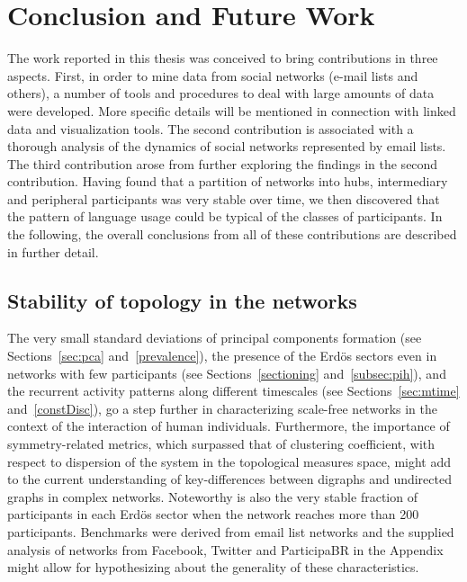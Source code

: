 \chapter{Conclusion and Future Work}
\label{ch:concl}
The work reported in this thesis was conceived to bring contributions in three aspects. First, in order to mine data from social networks (e-mail lists and others), a number of tools and procedures to deal with large amounts of data were developed. More specific details will be mentioned in connection with linked data and visualization tools. The second contribution is associated with a thorough analysis of the dynamics of social networks represented by email lists. The third contribution arose from further exploring the findings in the second contribution. Having found that a partition of networks into hubs, intermediary and peripheral participants was very stable over time, we then discovered that the pattern of language usage could be typical of the classes of participants. In the following, the overall conclusions from all of these contributions are described in further detail. 

\section{Stability of topology in the networks}

The very small standard deviations of principal components formation
(see Sections~\ref{sec:pca} and~\ref{prevalence}),
the presence of the Erd\"os sectors even in networks with
few participants (see Sections~\ref{sectioning} and~\ref{subsec:pih}),
and the recurrent activity patterns along different timescales (see Sections~\ref{sec:mtime} and~\ref{constDisc}),
go a step further in characterizing scale-free networks in the context
of the interaction of human individuals.
Furthermore, the importance of symmetry-related metrics,
which surpassed that of clustering coefficient,
with respect to dispersion of the system in the topological measures space,
might add to the current understanding of key-differences between digraphs and
undirected graphs in complex networks.
Noteworthy is also the very stable fraction of participants in each Erd\"os sector when the network reaches more than 200 participants.
Benchmarks were derived from email list networks
and the supplied analysis of
networks from Facebook,
Twitter and ParticipaBR in the Appendix might allow for hypothesizing
about the generality of these characteristics.

